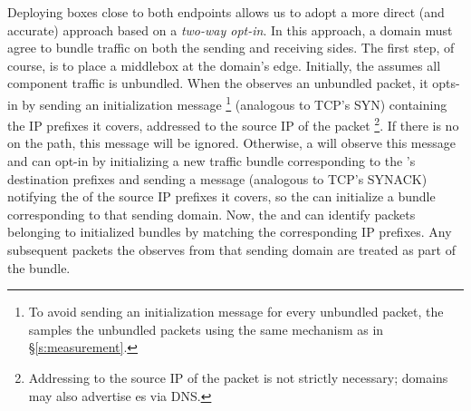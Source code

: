 Deploying \name boxes close to both endpoints allows us to adopt a more direct (and accurate) approach based on a \emph{two-way opt-in}.
In this approach, a domain must agree to bundle traffic on both the sending and receiving sides.
The first step, of course, is to place a \name middlebox at the domain's edge.
Initially, the \inbox assumes all component traffic is unbundled.
When the \outbox observes an unbundled packet, it opts-in by sending an initialization message
\footnote{To avoid sending an initialization message for every unbundled packet, the \outbox samples the unbundled packets using the same mechanism as in \S\ref{s:measurement}.} 
(analogous to TCP's SYN) 
containing the IP prefixes it covers, addressed to the source IP of the packet
\footnote{Addressing to the source IP of the packet is not strictly necessary; domains may also advertise \inbox{}es via \eg DNS.}.
If there is no \inbox on the path, this message will be ignored.
Otherwise, a \inbox will observe this message and can opt-in by initializing a new traffic bundle corresponding to the \outbox's destination prefixes and sending a message (analogous to TCP's SYNACK) notifying the \outbox of the source IP prefixes it covers, so the \outbox can initialize a bundle corresponding to that sending domain.
Now, the \inbox and \outbox can identify packets belonging to initialized bundles by matching the corresponding IP prefixes.
Any subsequent packets the \outbox observes from that sending domain are treated as part of the bundle.



